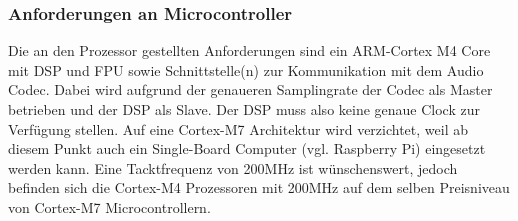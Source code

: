 \subsubsection{Anforderungen an Microcontroller}
\label{sec:Konzept_Microcontroller}

Die an den Prozessor gestellten Anforderungen sind ein ARM-Cortex M4 Core mit DSP und FPU sowie Schnittstelle(n) zur Kommunikation mit dem Audio Codec. 
Dabei wird aufgrund der genaueren Samplingrate der Codec als Master betrieben und der DSP als Slave.
Der DSP muss also keine genaue Clock zur Verfügung stellen. 
Auf eine Cortex-M7 Architektur wird verzichtet, weil ab diesem Punkt auch ein Single-Board Computer (vgl. Raspberry Pi) eingesetzt werden kann.
Eine Tacktfrequenz von 200MHz ist wünschenswert, jedoch befinden sich die Cortex-M4 Prozessoren mit 200MHz auf dem selben Preisniveau von Cortex-M7 Microcontrollern.


